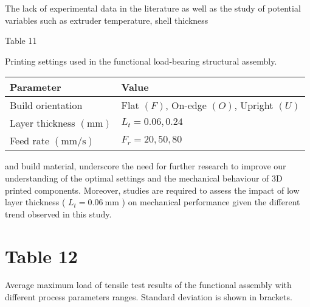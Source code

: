 \documentclass[10pt]{article}
\begin{document}
The lack of experimental data in the literature as well as the study of potential variables such as extruder temperature, shell thickness

Table 11

Printing settings used in the functional load-bearing structural assembly.

\begin{center}
\begin{tabular}{ll}
\hline
Parameter & Value \\
\hline
Build orientation & Flat $(F)$, On-edge $(O)$, Upright $(U)$ \\
Layer thickness $(\mathrm{mm})$ & $L_{t}=0.06,0.24$ \\
Feed rate $(\mathrm{mm} / \mathrm{s})$ & $F_{r}=20,50,80$ \\
\hline
\end{tabular}
\end{center}

and build material, underscore the need for further research to improve our understanding of the optimal settings and the mechanical behaviour of 3D printed components. Moreover, studies are required to assess the impact of low layer thickness ( $L_{t}=0.06 \mathrm{~mm}$ ) on mechanical performance given the different trend observed in this study.

\section*{Table 12}
Average maximum load of tensile test results of the functional assembly with different process parameters ranges. Standard deviation is shown in brackets.
\end{document}
